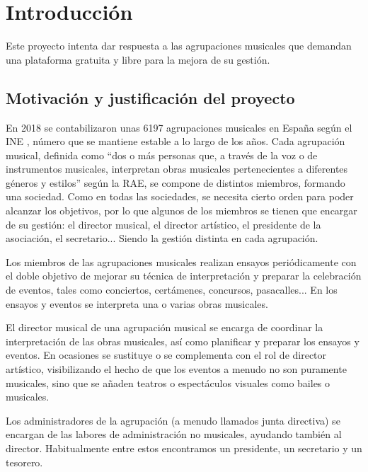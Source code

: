 \chapter{Introducción}

Este proyecto intenta dar respuesta a las agrupaciones musicales que demandan una plataforma gratuita y libre para la mejora de su gestión.

\section{Motivación y justificación del proyecto}


En 2018 se contabilizaron unas 6197 agrupaciones musicales en España según el INE \cite{ineNumeroAgrupaciones}, número que se mantiene estable a lo largo de los años. Cada agrupación musical, definida como ``dos o más personas que, a través de la voz o de instrumentos musicales, interpretan obras musicales pertenecientes a diferentes géneros y estilos'' según la RAE, se compone de distintos miembros, formando una sociedad. Como en todas las sociedades, se necesita cierto orden para poder alcanzar los objetivos, por lo que algunos de los miembros se tienen que encargar de su gestión: el director musical, el director artístico, el presidente de la asociación, el secretario... Siendo la gestión distinta en cada agrupación.

Los miembros de las agrupaciones musicales realizan ensayos periódicamente con el doble objetivo de mejorar su técnica de interpretación y preparar la celebración de eventos, tales como conciertos, certámenes, concursos, pasacalles... En los ensayos y eventos se interpreta una o varias obras musicales.

El director musical de una agrupación musical se encarga de coordinar la interpretación de las obras musicales, así como planificar y preparar los ensayos y eventos. En ocasiones se sustituye o se complementa con el rol de director artístico, visibilizando el hecho de que los eventos a menudo no son puramente musicales, sino que se añaden teatros o espectáculos visuales como bailes o musicales.

Los administradores de la agrupación (a menudo llamados junta directiva) se encargan de las labores de administración no musicales, ayudando también al director. Habitualmente entre estos encontramos un presidente, un secretario y un tesorero.

